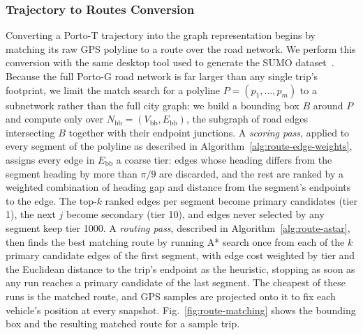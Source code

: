 \documentclass[pdflatex,sn-basic,Numbered]{sn-jnl}%
\begin{document}
\subsubsection{Trajectory to Routes Conversion}
Converting a Porto-T trajectory into the graph representation begins by matching its raw GPS polyline to a route over the road network. We perform this conversion with the same desktop tool used to generate the SUMO dataset~\cite{sumo_data_generator}. Because the full Porto-G road network is far larger than any single trip's footprint, we limit the match search for a polyline $P=(p_1,\ldots,p_m)$ to a subnetwork rather than the full city graph: we build a bounding box $B$ around $P$ and compute only over $N_{\mathrm{bb}}=(V_{\mathrm{bb}},E_{\mathrm{bb}})$, the subgraph of road edges intersecting $B$ together with their endpoint junctions. A \emph{scoring pass}, applied to every segment of the polyline as described in Algorithm~\ref{alg:route-edge-weights}, assigns every edge in $E_{\mathrm{bb}}$ a coarse tier: edges whose heading differs from the segment heading by more than $\pi/9$ are discarded, and the rest are ranked by a weighted combination of heading gap and distance from the segment's endpoints to the edge. The top-$k$ ranked edges per segment become primary candidates (tier 1), the next $j$ become secondary (tier 10), and edges never selected by any segment keep tier 1000. A \emph{routing pass}, described in Algorithm~\ref{alg:route-astar}, then finds the best matching route by running A* search once from each of the $k$ primary candidate edges of the first segment, with edge cost weighted by tier and the Euclidean distance to the trip's endpoint as the heuristic, stopping as soon as any run reaches a primary candidate of the last segment. The cheapest of these runs is the matched route, and GPS samples are projected onto it to fix each vehicle's position at every snapshot. Fig.~\ref{fig:route-matching} shows the bounding box and the resulting matched route for a sample trip.
\end{document}
